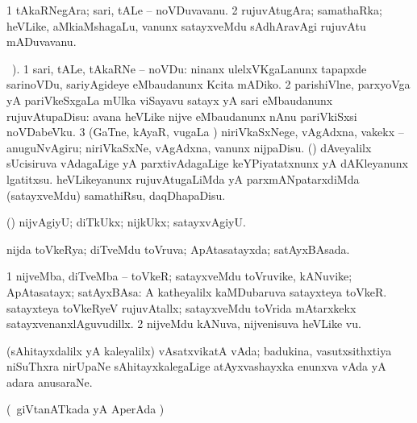 {{\bentry
{} 
\gl{\nA}
\expl{}
\bmng
\bnum
\num{1} tAkaRNegAra; sari, tALe -- noVDuvavanu. 
\num{2} rujuvAtugAra; samathaRka; heVLike, aMkiaMshagaLu, \mo vanunx satayxveMdu sAdhAravAgi rujuvAtu mADuvavanu. 
\enum
\emng
\eentry

\bentry
{} 
\gl{\sakirx}
\BUkaq\ ). \bmng
\bnum
\num{1} sari, tALe, tAkaRNe -- noVDu:  ninanx ulelxVKgaLanunx tapapxde sarinoVDu, sariyAgideye eMbaudanunx Kcita mADiko. 
\num{2} parishiVlne, parxyoVga yA pariVkeSxgaLa mUlka viSayavu satayx yA sari eMbaudanunx rujuvAtupaDisu:  avana heVLike nijve eMbaudanunx nAnu pariVkiSxsi noVDabeVku. 
\num{3} (GaTne, kAyaR, \mo vugaLa \vi) niriVkaSxNege, vAgAdxna, \mo vakekx -- anuguNvAgiru; niriVkaSxNe, vAgAdxna, \mo vanunx nijpaDisu. 
 (\nAyxshA) 
\banum
{} dAveyalilx sUcisiruva vAdagaLige yA parxtivAdagaLige keYPiyatatxnunx yA dAKleyanunx lgatitxsu. 
 heVLikeyanunx rujuvAtugaLiMda yA parxmANpatarxdiMda (satayxveMdu) samathiRsu, daqDhapaDisu. 
\eanum
\numie
\enum
\emng
\eentry

\bentry
{} 
\gl{\kirxvi}
\expl{}
\bmng
 (\pArxparx) nijvAgiyU; diTkUkx; nijkUkx; satayxvAgiyU. 
\emng
\eentry

\bentry
{} 
\gl{\gu}
\expl{}
\bmng
 nijda toVkeRya; diTveMdu toVruva; ApAtasatayxda; satAyxBAsada. 
\emng
\eentry

\bentry
{} 
\gl{\nA}
\expl{}
\bmng
\bnum
\num{1} nijveMba, diTveMba -- toVkeR; satayxveMdu toVruvike, kANuvike; ApAtasatayx; satAyxBAsa:  A katheyalilx kaMDubaruva satayxteya toVkeR.  satayxteya toVkeRyeV rujuvAtallx; satayxveMdu toVrida mAtarxkekx satayxvenanxlAguvudillx. 
\num{2} nijveMdu kANuva, nijvenisuva heVLike \mo vu. 
\enum
\emng
\eentry

\bentry
{} 
\gl{\nA}
\expl{}
\bmng
 (sAhitayxdalilx yA kaleyalilx) vAsatxvikatA vAda; badukina, vasutxsithxtiya niSuThxra nirUpaNe sAhitayxkalegaLige atAyxvashayxka enunxva vAda yA adara anusaraNe. 
\emng
\eentry

\bentry
{} 
\gl{\nA}
\bmng
 (\kanmu\ giVtanATkada yA AperAda \vi)  
\emng
\eentry

}}
